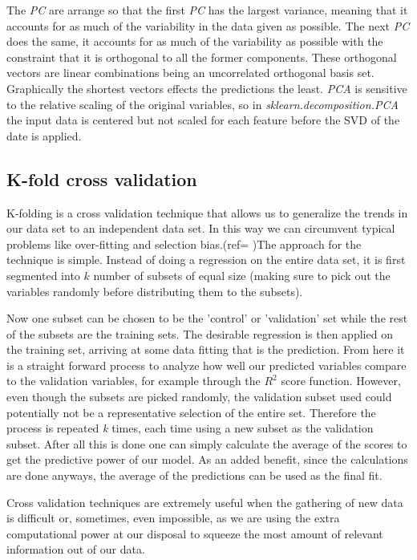 	The \textit{PC} are arrange so that the first \textit{PC} has the largest variance, meaning that it accounts for as much of the variability in the data given as possible. The next \textit{PC} does the same, it accounts for as much of the variability as possible with the constraint that it is orthogonal to all the former components. These orthogonal vectors are linear combinations being an uncorrelated orthogonal basis set. Graphically the shortest vectors effects the predictions the least. \textit{PCA} is sensitive to the relative scaling of the original variables, so in \textit{sklearn.decomposition.PCA} the input data is centered but not scaled for each feature before the SVD of the date is applied. 

\subsection{K-fold cross validation}
	K-folding is a cross validation technique that allows us to generalize the trends in our data set to an independent data set. In this way we can circumvent typical problems like over-fitting and selection bias.(ref=\cite{cross-valid} )The approach for the technique is simple. Instead of doing a regression on the entire data set, it is first segmented into $k$ number of subsets of equal size (making sure to pick out the variables randomly before distributing them to the subsets). 
	
	Now one subset can be chosen to be the 'control' or 'validation' set while the rest of the subsets are the training sets. The desirable regression is then applied on the training set, arriving at some data fitting that is the prediction. From here it is a straight forward process to analyze how well our predicted variables compare to the validation variables, for example through the $R^2$ score function. However, even though the subsets are picked randomly, the validation subset used could potentially not be a representative selection of the entire set. Therefore the process is repeated \textit{k} times, each time using a new subset as the validation subset. After all this is done one can simply calculate the average of the scores to get the predictive power of our model. As an added benefit, since the calculations are done anyways, the average of the predictions can be used as the final fit. 
	
	Cross validation techniques are extremely useful when the gathering of new data is difficult or, sometimes, even impossible, as we are using the extra computational power at our disposal to squeeze the most amount of relevant information out of our data.\\

